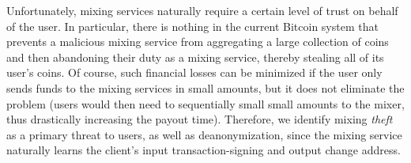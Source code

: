 Unfortunately, mixing services naturally require a certain level of trust on behalf of the user. In particular, there is nothing in the current Bitcoin system that prevents a malicious mixing service from aggregating a large collection of coins and then abandoning their duty as a mixing service, thereby stealing all of its user's coins. Of course, such financial losses can be minimized if the user only sends funds to the mixing services in small amounts, but it does not eliminate the problem (users would then need to sequentially small small amounts to the mixer, thus drastically increasing the payout time). Therefore, we identify mixing \emph{theft} as a primary threat to users, as well as deanonymization, since the mixing service naturally learns the client's input transaction-signing and output change address.

